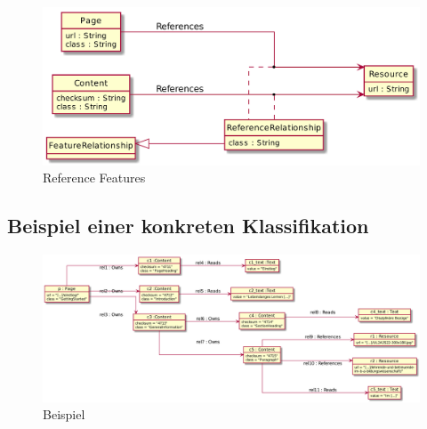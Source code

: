         \begin{figure}
            \centering
            \includegraphics[width=\textwidth]{../resources/db-data-model/resource-relationship.png}
            \caption{Reference Features}
            \label{image:dbDataModelResourceRelationship}
        \end{figure}

    \subsection{Beispiel einer konkreten Klassifikation}
        \begin{figure}
            \centering
            \includegraphics[width=\textwidth]{../resources/db-data-model/example/example.png}
            \caption{Beispiel}
            \label{image:dbDataModelExampleOverview}
        \end{figure}

